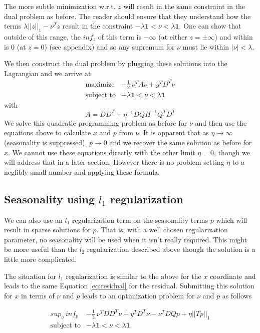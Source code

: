 \documentclass{article}
\begin{document}
The more subtle minimization w.r.t. $z$ will result in the same constraint in the dual problem as before. The reader
should ensure that they understand how the terms $\lambda ||z||_1 - \nu^T z$ result in the constraint
$- \lambda \mathbf{1} < \nu < \lambda \mathbf{1}$. One can show that outside of this range, the $inf_z$ of this term
is $-\infty$ (at either $z = \pm \infty$) and within is 0 (at $z=0$) (see appendix) and so any supremum for $\nu$
must lie within $|\nu| < \lambda$.

We then construct the dual problem by plugging these solutions into the Lagrangian and we arrive at
\begin{eqnarray}
\mbox{maximize} & -\frac{1}{2} ~ \nu^T A \nu + y^T D^T \nu \\
\mbox{subject to} & - \lambda \mathbf{1} < \nu < \lambda \mathbf{1}
\end{eqnarray}
with
\[
A = D D^T + \eta^{-1} D Q H^{-1} Q^T D^T
\]
We solve this quadratic programming problem as before for $\nu$ and then use the equations above
to calculate $x$ and $p$ from $\nu$. It is apparent that as $\eta \rightarrow \infty$ (seasonality is suppressed),
$p \rightarrow 0$ and we recover the same solution as before for $x$. We cannot use these equations directly with
the other limit $\eta = 0$, though we will address that in a later section. However there is no problem setting
$\eta$ to a neglibly small number and applying these formula.

\subsection{Seasonality using $l_1$ regularization}
We can also use an $l_1$ regularization term on the seasonality terms $p$ which will result in
sparse solutions for $p$. That is, with a well chosen regularization parameter,
no seasonality will be used when it isn't really required. This might be more useful than the $l_2$
regularization described above though the solution is a little more complicated.

The situation for $l_1$ regularization is similar to the above for the $x$ coordinate and leads to the
same Equation \ref{eq:residual} for the residual. Submitting this solution for $x$ in terms of $\nu$ and $p$
leads to an optimization problem for $\nu$ and $p$ as follows

\begin{eqnarray}
sup_{\nu} ~ inf_p & -\frac{1}{2} ~ \nu^T D D^T \nu + y^T D^T \nu -\nu^T D Q p + \eta ||T p||_1 \\
\mbox{subject to} & - \lambda \mathbf{1} < \nu < \lambda \mathbf{1}
\end{eqnarray}
\end{document}
